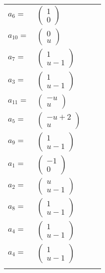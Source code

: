 \documentclass[1p]{elsarticle_modified}
\theoremstyle{definition}
\begin{document}
\begin{tabular}{m{7pt} m{180pt} m{7pt} m{180pt} }
\flushright $a_{6}=$&$\begin{pmatrix}1\\0\end{pmatrix}$ \\
\flushright $a_{10}=$&$\begin{pmatrix}0\\u\end{pmatrix}$ \\
\flushright $a_{7}=$&$\begin{pmatrix}1\\u-1\end{pmatrix}$ \\
\flushright $a_{3}=$&$\begin{pmatrix}1\\u-1\end{pmatrix}$ \\
\flushright $a_{11}=$&$\begin{pmatrix}- u\\u\end{pmatrix}$ \\
\flushright $a_{5}=$&$\begin{pmatrix}- u+2\\u\end{pmatrix}$ \\
\flushright $a_{9}=$&$\begin{pmatrix}1\\u-1\end{pmatrix}$ \\
\flushright $a_{1}=$&$\begin{pmatrix}-1\\0\end{pmatrix}$ \\
\flushright $a_{2}=$&$\begin{pmatrix}u\\u-1\end{pmatrix}$ \\
\flushright $a_{8}=$&$\begin{pmatrix}1\\u-1\end{pmatrix}$ \\
\flushright $a_{4}=$&$\begin{pmatrix}1\\u-1\end{pmatrix}$\\ \flushright $a_{4}=$&$\begin{pmatrix}1\\u-1\end{pmatrix}$\\&\end{tabular}
\end{document}
